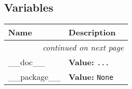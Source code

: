 
  \subsection{Variables}

    \vspace{-1cm}
\hspace{\varindent}\begin{longtable}{|p{\varnamewidth}|p{\vardescrwidth}|l}
\cline{1-2}
\cline{1-2} \centering \textbf{Name} & \centering \textbf{Description}& \\
\cline{1-2}
\endhead\cline{1-2}\multicolumn{3}{r}{\small\textit{continued on next page}}\\\endfoot\cline{1-2}
\endlastfoot\raggedright \_\-\_\-d\-o\-c\-\_\-\_\- & \raggedright \textbf{Value:} 
{\tt \texttt{...}}&\\
\cline{1-2}
\raggedright \_\-\_\-p\-a\-c\-k\-a\-g\-e\-\_\-\_\- & \raggedright \textbf{Value:} 
{\tt None}&\\
\cline{1-2}
\end{longtable}

